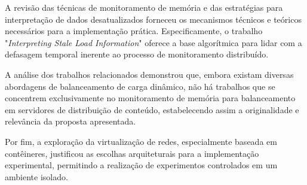 A revisão das técnicas de monitoramento de memória e das estratégias para interpretação de dados desatualizados forneceu os mecanismos técnicos e teóricos necessários para a implementação prática. Especificamente, o trabalho "\textit{Interpreting Stale Load Information}" oferece a base algorítmica para lidar com a defasagem temporal inerente ao processo de monitoramento distribuído.

A análise dos trabalhos relacionados demonstrou que, embora existam diversas abordagens de balanceamento de carga dinâmico, não há trabalhos que se concentrem exclusivamente no monitoramento de memória para balanceamento em servidores de distribuição de conteúdo, estabelecendo assim a originalidade e relevância da proposta apresentada.

Por fim, a exploração da virtualização de redes, especialmente baseada em contêineres, justificou as escolhas arquiteturais para a implementação experimental, permitindo a realização de experimentos controlados em um ambiente isolado.

